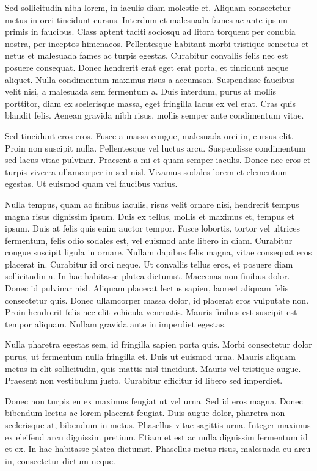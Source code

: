 Sed sollicitudin nibh lorem, in iaculis diam molestie et. Aliquam consectetur metus in orci tincidunt cursus. Interdum et malesuada fames ac ante ipsum primis in faucibus. Class aptent taciti sociosqu ad litora torquent per conubia nostra, per inceptos himenaeos. Pellentesque habitant morbi tristique senectus et netus et malesuada fames ac turpis egestas. Curabitur convallis felis nec est posuere consequat. Donec hendrerit erat eget erat porta, et tincidunt neque aliquet. Nulla condimentum maximus risus a accumsan. Suspendisse faucibus velit nisi, a malesuada sem fermentum a. Duis interdum, purus at mollis porttitor, diam ex scelerisque massa, eget fringilla lacus ex vel erat. Cras quis blandit felis. Aenean gravida nibh risus, mollis semper ante condimentum vitae.

Sed tincidunt eros eros. Fusce a massa congue, malesuada orci in, cursus elit. Proin non suscipit nulla. Pellentesque vel luctus arcu. Suspendisse condimentum sed lacus vitae pulvinar. Praesent a mi et quam semper iaculis. Donec nec eros et turpis viverra ullamcorper in sed nisl. Vivamus sodales lorem et elementum egestas. Ut euismod quam vel faucibus varius.

Nulla tempus, quam ac finibus iaculis, risus velit ornare nisi, hendrerit tempus magna risus dignissim ipsum. Duis ex tellus, mollis et maximus et, tempus et ipsum. Duis at felis quis enim auctor tempor. Fusce lobortis, tortor vel ultrices fermentum, felis odio sodales est, vel euismod ante libero in diam. Curabitur congue suscipit ligula in ornare. Nullam dapibus felis magna, vitae consequat eros placerat in. Curabitur id orci neque. Ut convallis tellus eros, et posuere diam sollicitudin a. In hac habitasse platea dictumst. Maecenas non finibus dolor. Donec id pulvinar nisl. Aliquam placerat lectus sapien, laoreet aliquam felis consectetur quis. Donec ullamcorper massa dolor, id placerat eros vulputate non. Proin hendrerit felis nec elit vehicula venenatis. Mauris finibus est suscipit est tempor aliquam. Nullam gravida ante in imperdiet egestas.

Nulla pharetra egestas sem, id fringilla sapien porta quis. Morbi consectetur dolor purus, ut fermentum nulla fringilla et. Duis ut euismod urna. Mauris aliquam metus in elit sollicitudin, quis mattis nisl tincidunt. Mauris vel tristique augue. Praesent non vestibulum justo. Curabitur efficitur id libero sed imperdiet.

Donec non turpis eu ex maximus feugiat ut vel urna. Sed id eros magna. Donec bibendum lectus ac lorem placerat feugiat. Duis augue dolor, pharetra non scelerisque at, bibendum in metus. Phasellus vitae sagittis urna. Integer maximus ex eleifend arcu dignissim pretium. Etiam et est ac nulla dignissim fermentum id et ex. In hac habitasse platea dictumst. Phasellus metus risus, malesuada eu arcu in, consectetur dictum neque.

